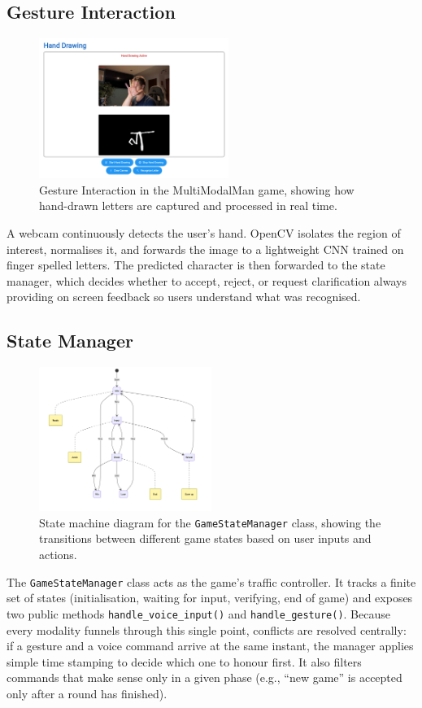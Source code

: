 \subsection*{Gesture Interaction}
\begin{figure}
    \centering
    \includegraphics[width=0.55\textwidth]{./images/hand-draw.png}
    \caption{Gesture Interaction in the MultiModalMan game, showing how hand-drawn letters are captured and processed in real time.}
\end{figure}
A webcam continuously detects the user’s hand. OpenCV isolates the region of interest, normalises it, and forwards the image to a lightweight CNN trained on finger spelled letters. The predicted character is then forwarded to the state manager, which decides whether to accept, reject, or request clarification always providing on screen feedback so users understand what was recognised.

\subsection*{State Manager}
\begin{figure}
    \centering
    \includegraphics[width=0.5\textwidth]{./images/game_state_manager_state_machine.png}
    \caption{State machine diagram for the \texttt{GameStateManager} class, showing the transitions between different game states based on user inputs and actions.}
    \label{fig:state_machine}
\end{figure}
The \texttt{GameStateManager} class acts as the game’s traffic controller. It tracks a finite set of states (initialisation, waiting for input, verifying, end of game) and exposes two public methods \texttt{handle\_voice\_input()} and \texttt{handle\_gesture()}. Because every modality funnels through this single point, conflicts are resolved centrally: if a gesture and a voice command arrive at the same instant, the manager applies simple time stamping to decide which one to honour first. It also filters commands that make sense only in a given phase (e.g., “new game” is accepted only after a round has finished).

